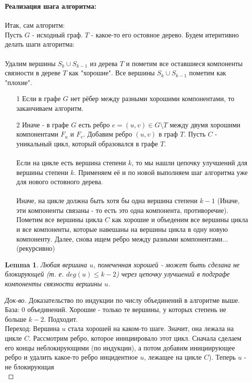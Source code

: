 \documentclass[a4paper, 12pt]{article}
\newtheorem{lemma}[theorem]{Lemma}
\begin{document}
\textbf{Реализация шага алгоритма:}\\
\\
Итак, сам алгоритм:\\
Пусть $G$ - исходный граф. $T$ - какое-то его остовное дерево. Будем итеритивно делать шаги алгоритма:\\
\\
Удалим вершины $S_k \cup S_{k - 1}$ из дерева $T$ и пометим все оставшиеся компоненты связности в дереве $T$ как "хорошие". Все вершины $S_k \cup S_{k - 1}$ пометим как "плохие".\\
\begin{enumerate}

\item[1] Если в графе $G$ нет рёбер между разными хорошими компонентами, то заканчиваем алгоритм.

\item[2] Иначе - в графе $G$ есть ребро $e = (u, v) \in G \setminus T$ между двумя хорошими компонентами $F_u$ и $F_v$. Добавим ребро $(u, v)$ в граф $T$. Пусть $C$ - уникальный цикл, который образовался в графе $T$.\\\\
Если на цикле есть вершина степени $k$, то мы нашли цепочку улучшений для вершины степени $k$. Применяем её и по новой выполняем шаг алгоритма уже для нового остовного дерева.\\\\
Иначе, на цикле должна быть хотя бы одна вершина степени $k - 1$ (Иначе, эти компоненты связаны - то есть это одна компонента, противоречие). Пометим все вершины цикла $C$ как хорошие и объеденим все вершины цикла и все компоненты, которые навешаны на вершины цикла в одну новую компоненту. Далее, снова ищем ребро между разными компонентами... (рекурсивно)

\end{enumerate}

\begin{lemma}
Любая вершина $u$, помеченная хорошей - может быть сделана не блокирующей (т. е. $deg(u) \leqslant k - 2 $) через цепочку улучшений в подграфе компоненты связности вершины $u$.
\end{lemma}
\begin{proof}[Док-во]
Доказательство по индукции по числу объединений в алгоритме выше.\\
База: 0 объединений. Хорошие - только те вершины, у которых степень не больше $k - 2$. Подходит.\\
Переход: Вершина $u$ стала хорошей на каком-то шаге. Значит, она лежала на цикле $C$. Рассмотрим ребро, которое инициировало этот цикл. Сначала сделаем его концы неблокирующими (по индукции), а потом добавим инициирующее ребро и удалить какое-то ребро инцидентное $u$, лежащее на цикле $C$). Теперь $u$ - не блокирующая\\
\end{proof}
\end{document}
